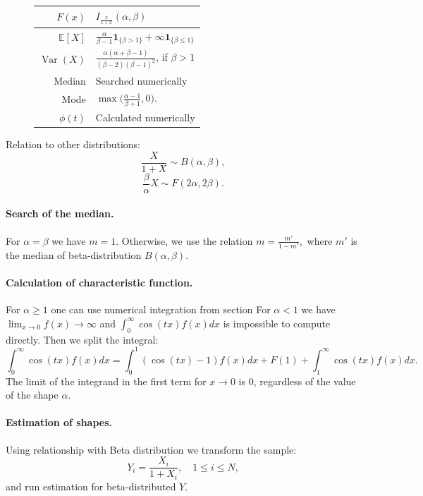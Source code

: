 \documentclass[a4paper,11pt]{article}
\theoremstyle{plain}
\theoremstyle{definition}
\newcommand{\ME}{\mathbb{E}}
\newcommand{\Var}{\operatorname{Var}}
\begin{document}
\begin{figure}[!htb]
\begin{minipage}{0.4\textwidth}
\begin{tabular}{| r | l |}
				\hline
				$F(x)$ & $I_{\frac{x}{1+x}}(\alpha, \beta)$\\
				\hline
				$\ME[X]$ & $ \frac{\alpha}{\beta - 1}\mathbf{1}_{\{\beta > 1 \} } + \infty \mathbf{1}_{\{\beta \leq 1\} } $ \\
				\hline
				$\Var(X)$ & $\frac{ \alpha (\alpha +\beta - 1) }{ (\beta-2)(\beta-1)^2 }$, if $\beta > 1$ \\
				\hline
				Median & Searched numerically \\
				\hline
				Mode & $\max\big( \frac{\alpha-1}{\beta+1}, 0 \big)$. \\
				\hline
				$\phi(t)$ & Calculated numerically \\
				\hline
			\end{tabular}
		\end{minipage}
	\end{figure}
	Relation to other distributions:
	\[\frac{X}{1+X} \sim B(\alpha, \beta),\]
	\[
	\frac{\beta}{\alpha}X \sim F(2\alpha, 2\beta ).
	\]
	
	\paragraph{Search of the median.} For $\alpha = \beta$ we have $m=1$. Otherwise, we use the relation
	$m = \frac{m'}{1-m'},$
	where $m'$ is the median of beta-distribution $B(\alpha, \beta)$.
	
	\paragraph{Calculation of characteristic function.} For $\alpha \geq 1$ one can use numerical integration from section %
	For $\alpha < 1$ we have $\lim_{x \rightarrow 0} f(x) \rightarrow \infty$ and $\int_{0}^{\infty} \cos(tx)f(x) dx$ is impossible to compute directly. Then we split the integral:
	\[
	\int_{0}^{\infty} \cos(tx)f(x) dx = \int_{0}^{1}(\cos(tx)-1) f(x) dx + F(1) + \int_{1}^{\infty} \cos(tx)f(x) dx.
	\]
	The limit of the integrand in the first term for $x \rightarrow 0$ is $0$, regardless of the value of the shape $\alpha$.
	
	\paragraph{Estimation of shapes.} Using relationship with Beta distribution we transform the sample:
	\[ Y_i = \frac{X_i}{1+X_i}, \quad 1 \leq i \leq N, \]
	and run estimation for beta-distributed $Y$.
\end{document}
